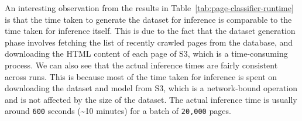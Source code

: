 An interesting observation from the results in Table~\ref{tab:page-classifier-runtime} is that the time taken to generate the dataset for inference is comparable to the time taken for inference itself.
This is due to the fact that the dataset generation phase involves fetching the list of recently crawled pages from the database, and downloading the HTML content of each page of S3, which is a time-consuming process.
We can also see that the actual inference times are fairly consistent across runs.
This is because most of the time taken for inference is spent on downloading the dataset and model from S3, which is a network-bound operation and is not affected by the size of the dataset.
The actual inference time is usually around \texttt{600} seconds (\textasciitilde{}10 minutes) for a batch of \texttt{20,000} pages.